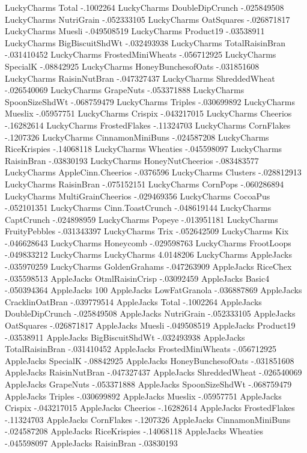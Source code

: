 LuckyCharms	Total	-.1002264
LuckyCharms	DoubleDipCrunch	-.025849508
LuckyCharms	NutriGrain	-.052333105
LuckyCharms	OatSquares	-.026871817
LuckyCharms	Muesli	-.049508519
LuckyCharms	Product19	-.03538911
LuckyCharms	BigBiscuitShdWt	-.032493938
LuckyCharms	TotalRaisinBran	-.031410452
LuckyCharms	FrostedMiniWheats	-.056712925
LuckyCharms	SpecialK	-.08842925
LuckyCharms	HoneyBunchesofOats	-.031851608
LuckyCharms	RaisinNutBran	-.047327437
LuckyCharms	ShreddedWheat	-.026540069
LuckyCharms	GrapeNuts	-.053371888
LuckyCharms	SpoonSizeShdWt	-.068759479
LuckyCharms	Triples	-.030699892
LuckyCharms	Mueslix	-.05957751
LuckyCharms	Crispix	-.043217015
LuckyCharms	Cheerios	-.16282614
LuckyCharms	FrostedFlakes	-.11324703
LuckyCharms	CornFlakes	-.1207326
LuckyCharms	CinnamonMiniBuns	-.024587208
LuckyCharms	RiceKrispies	-.14068118
LuckyCharms	Wheaties	-.045598097
LuckyCharms	RaisinBran	-.03830193
LuckyCharms	HoneyNutCheerios	-.083483577
LuckyCharms	AppleCinn.Cheerios	-.0376596
LuckyCharms	Clusters	-.028812913
LuckyCharms	RaisinBran	-.075152151
LuckyCharms	CornPops	-.060286894
LuckyCharms	MultiGrainCheerios	-.029469356
LuckyCharms	CocoaPus	-.052101351
LuckyCharms	Cinn.ToastCrunch	-.048619144
LuckyCharms	CaptCrunch	-.024898959
LuckyCharms	Popeye	-.013951181
LuckyCharms	FruityPebbles	-.031343397
LuckyCharms	Trix	-.052642509
LuckyCharms	Kix	-.046628643
LuckyCharms	Honeycomb	-.029598763
LuckyCharms	FrootLoops	-.049833212
LuckyCharms	LuckyCharms	4.0148206
LuckyCharms	AppleJacks	-.035970259
LuckyCharms	GoldenGrahams	-.047263909
AppleJacks	RiceChex	-.035598513
AppleJacks	OtmlRaisinCrisp	-.03092459
AppleJacks	Basic4	-.050394364
AppleJacks	100%
AppleJacks	LowFatGranola	-.036887869
AppleJacks	CracklinOatBran	-.039779514
AppleJacks	Total	-.1002264
AppleJacks	DoubleDipCrunch	-.025849508
AppleJacks	NutriGrain	-.052333105
AppleJacks	OatSquares	-.026871817
AppleJacks	Muesli	-.049508519
AppleJacks	Product19	-.03538911
AppleJacks	BigBiscuitShdWt	-.032493938
AppleJacks	TotalRaisinBran	-.031410452
AppleJacks	FrostedMiniWheats	-.056712925
AppleJacks	SpecialK	-.08842925
AppleJacks	HoneyBunchesofOats	-.031851608
AppleJacks	RaisinNutBran	-.047327437
AppleJacks	ShreddedWheat	-.026540069
AppleJacks	GrapeNuts	-.053371888
AppleJacks	SpoonSizeShdWt	-.068759479
AppleJacks	Triples	-.030699892
AppleJacks	Mueslix	-.05957751
AppleJacks	Crispix	-.043217015
AppleJacks	Cheerios	-.16282614
AppleJacks	FrostedFlakes	-.11324703
AppleJacks	CornFlakes	-.1207326
AppleJacks	CinnamonMiniBuns	-.024587208
AppleJacks	RiceKrispies	-.14068118
AppleJacks	Wheaties	-.045598097
AppleJacks	RaisinBran	-.03830193
